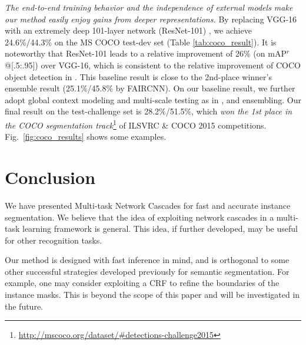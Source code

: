\documentclass[10pt,twocolumn,letterpaper]{article}
\begin{document}
\emph{The end-to-end training behavior and the independence of external models make our method easily enjoy gains from deeper representations.}
By replacing VGG-16 with an extremely deep 101-layer network (ResNet-101) \cite{He2015a}, we achieve 24.6\%/44.3\% on the MS COCO test-dev set (Table \ref{tab:coco_result}).
It is noteworthy that ResNet-101 leads to a relative improvement of 26\% (on mAP$^r$@[.5:.95]) over VGG-16, which is consistent to the relative improvement of COCO object detection in \cite{He2015a}.
This baseline result is close to the 2nd-place winner's ensemble result (25.1\%/45.8\% by FAIRCNN).
On our baseline result, we further adopt global context modeling and multi-scale testing as in \cite{He2015a}, and ensembling. Our final result on the test-challenge set is 28.2\%/51.5\%, which \emph{won the 1st place in the COCO segmentation track}\footnote{\fontsize{7pt}{1em}\selectfont\url{http://mscoco.org/dataset/\#detections-challenge2015}} of ILSVRC \& COCO 2015 competitions. Fig.~\ref{fig:coco_results} shows some examples.



\section{Conclusion}

\vspace{-.5em}

We have presented Multi-task Network Cascades for fast and accurate instance segmentation. We believe that the idea of exploiting network cascades in a multi-task learning framework is general. This idea, if further developed, may be useful for other recognition tasks.

Our method is designed with fast inference in mind, and is orthogonal to some other successful strategies developed previously for semantic segmentation. For example, one may consider exploiting a CRF \cite{Chen2015} to refine the boundaries of the instance masks. This is beyond the scope of this paper and will be investigated in the future.

{\small


}
\end{document}
